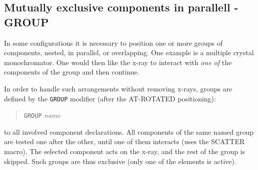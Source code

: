 \subsection{Mutually exclusive components in parallell - GROUP} 
\label{s:instrdefs-group}
In some configurations it is necessary to position one or
more groups of components, nested, in parallel, or overlapping. One
example is a multiple crystal monochromator. One would then like the
x-ray to interact with \emph{one of} the components of the group
and then continue.

In order to handle such arrangements without removing x-rays, groups are defined by the \texttt{GROUP} modifier (after the AT-ROTATED positioning):
\begin{quote}
  \texttt{GROUP} \textit{name}
\end{quote}
to all involved component declarations. 
All components of the same named group are tested one after the other,
until one of them interacts (uses the SCATTER
macro). The selected component acts on
the x-ray, and the rest of the group is skipped. Such groups are thus exclusive (only one of the elements is active).

